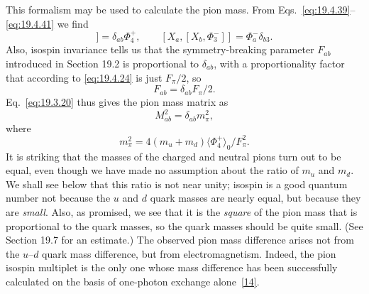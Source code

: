 This formalism may be used to calculate the pion mass. From Eqs.~\eqref{eq:19.4.39}--\eqref{eq:19.4.41} we find
\begin{equation}
[X_a,[X_b,\Phi_4^+]]=\delta_{ab}\Phi_4^+,
\qquad
[X_a,[X_b,\Phi_3^-]]=\Phi_a^-\delta_{b3}.
\tag{19.4.43}\label{eq:19.4.43}
\end{equation}
Also, isospin invariance tells us that the symmetry-breaking parameter $F_{ab}$ introduced in Section 19.2 is proportional to $\delta_{ab}$, with a proportionality factor that according to \eqref{eq:19.4.24} is just $F_\pi/2$, so
\begin{equation}
F_{ab}=\delta_{ab}F_\pi/2.
\tag{19.4.44}\label{eq:19.4.44}
\end{equation}
Eq.~\eqref{eq:19.3.20} thus gives the pion mass matrix as
\begin{equation}
M_{ab}^2=\delta_{ab}m_\pi^2,
\tag{19.4.45}\label{eq:19.4.45}
\end{equation}
where
\begin{equation}
m_\pi^2=4(m_u+m_d)\langle\Phi_4^+\rangle_0/F_\pi^2.
\tag{19.4.46}\label{eq:19.4.46}
\end{equation}
It is striking that the masses of the charged and neutral pions turn out to be equal, even though we have made no assumption about the ratio of $m_u$ and $m_d$. We shall see below that this ratio is not near unity; isospin is a good quantum number not because the $u$ and $d$ quark masses are nearly equal, but because they are \emph{small}. Also, as promised, we see that it is the \emph{square} of the pion mass that is proportional to the quark masses, so the quark masses should be quite small. (See Section 19.7 for an estimate.) The observed pion mass difference arises not from the $u$--$d$ quark mass difference, but from electromagnetism. Indeed, the pion isospin multiplet is the only one whose mass difference has been successfully calculated on the basis of one-photon exchange alone~\hyperref[ch19-ref-14]{[14]}.


